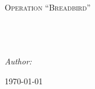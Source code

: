 
\begin{titlepage}
\begin{center}

\textsc{\Large Operation \enquote{Breadbird}}\\[0.5cm] %

\HRule \\[0.4cm] %
{\huge \bfseries \ttitle}\\[0.4cm] %
\HRule \\[1.5cm] %
 
\begin{minipage}{1\textwidth}
\begin{flushleft} \large
\emph{Author:}\\
\href{https://github.com/sunsided}{\authornames} %
\end{flushleft}
\end{minipage}
  
\bigbreak  
  
{\large \today}\\[4cm] %
 
\vfill
\end{center}

\end{titlepage}